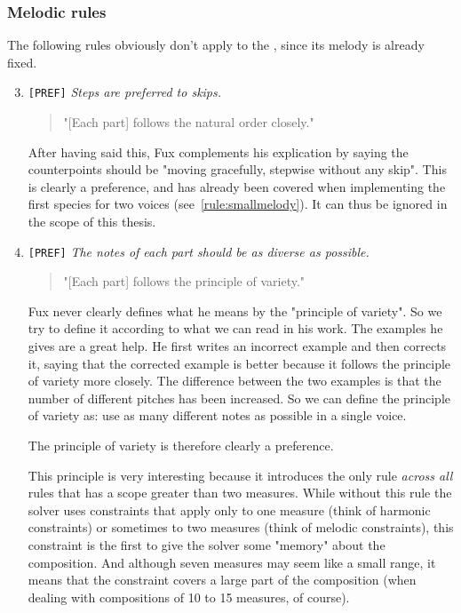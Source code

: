 \subsubsection{Melodic rules}
The following rules obviously don't apply to the \cf, since its melody is already fixed.
\begin{enumerate}[wide, label=\bfseries 1.M\arabic*]
\setcounter{enumi}{2} %
    \item\label{rule:steps-prefered} \texttt{[PREF]} \textit{Steps are preferred to skips.}

    \begin{quotation}
    "[Each part] follows the natural order closely."
    \textcite[p.73]{GaPEng}
    \end{quotation}

    After having said this, Fux complements his explication by saying the counterpoints should be "moving gracefully, stepwise without any skip". This is clearly a preference, and has already been covered when implementing the first species for two voices (see~\ref{rule:smallmelody}). It can thus be ignored in the scope of this thesis.

    \item\label{rule:variety} \texttt{[PREF]}  \textit{The notes of each part should be as diverse as possible.}

    \begin{quotation}
    "[Each part] follows the principle of variety."
    \textcite[p.73]{GaPEng}
    \end{quotation}

    Fux never clearly defines what he means by the "principle of variety". So we try to define it according to what we can read in his work. The examples he gives are a great help. He first writes an incorrect example and then corrects it, saying that the corrected example is better because it follows the principle of variety more closely. The difference between the two examples is that the number of different pitches has been increased. So we can define the principle of variety as: use as many different notes as possible in a single voice. 

    The principle of variety is therefore clearly a preference.

    This principle is very interesting because it introduces the only rule \textit{across all} rules that has a scope greater than two measures. While without this rule the solver uses constraints that apply only to one measure (think of harmonic constraints) or sometimes to two measures (think of melodic constraints), this constraint is the first to give the solver some "memory" about the composition. And although seven measures may seem like a small range, it means that the constraint covers a large part of the composition (when dealing with compositions of 10 to 15 measures, of course).


\end{enumerate}
